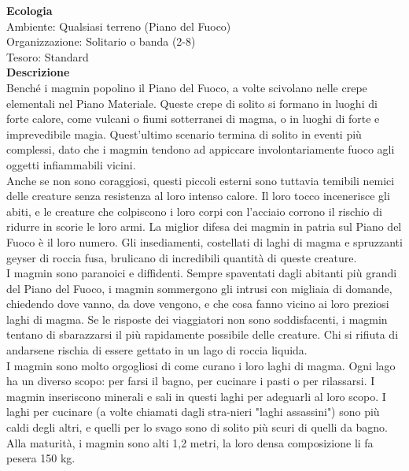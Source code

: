 \begin{multicols}{2}
\textbf{Ecologia}\\
Ambiente: Qualsiasi terreno (Piano del Fuoco)\\
Organizzazione: Solitario o banda (2-8)\\
Tesoro: Standard\\
\textbf{Descrizione}\\
Benché i magmin popolino il Piano del Fuoco, a volte scivolano nelle crepe elementali nel Piano Materiale. Queste crepe di solito si formano in luoghi di forte calore, come vulcani o fiumi sotterranei di magma, o in luoghi di forte e imprevedibile magia. Quest'ultimo scenario termina di solito in eventi più complessi, dato che i magmin tendono ad appiccare involontariamente fuoco agli oggetti infiammabili vicini.\\

Anche se non sono coraggiosi, questi piccoli esterni sono tuttavia temibili nemici delle creature senza resistenza al loro intenso calore. Il loro tocco incenerisce gli abiti, e le creature che colpiscono i loro corpi con l'acciaio corrono il rischio di ridurre in scorie le loro armi. La miglior difesa dei magmin in patria sul Piano del Fuoco è il loro numero. Gli insediamenti, costellati di laghi di magma e spruzzanti geyser di roccia fusa, brulicano di incredibili quantità di queste creature.\\

I magmin sono paranoici e diffidenti. Sempre spaventati dagli abitanti più grandi del Piano del Fuoco, i magmin sommergono gli intrusi con migliaia di domande, chiedendo dove vanno, da dove vengono, e che cosa fanno vicino ai loro preziosi laghi di magma. Se le risposte dei viaggiatori non sono soddisfacenti, i magmin tentano di sbarazzarsi il più rapidamente possibile delle creature. Chi si rifiuta di andarsene rischia di essere gettato in un lago di roccia liquida.\\

I magmin sono molto orgogliosi di come curano i loro laghi di magma. Ogni lago ha un diverso scopo: per farsi il bagno, per cucinare i pasti o per rilassarsi. I magmin inseriscono minerali e sali in questi laghi per adeguarli al loro scopo. I laghi per cucinare (a volte chiamati dagli stra-nieri "laghi assassini") sono più caldi degli altri, e quelli per lo svago sono di solito più scuri di quelli da bagno.\\

Alla maturità, i magmin sono alti 1,2 metri, la loro densa composizione li fa pesera 150 kg.\\



\end{multicols}
